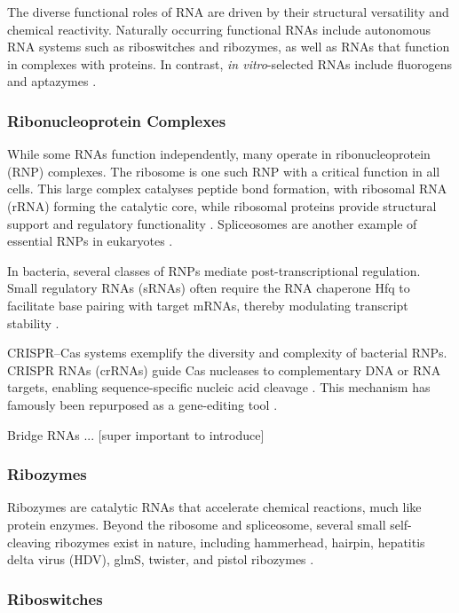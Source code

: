 \documentclass{article}
\begin{document}
The diverse functional roles of RNA are driven by their structural versatility and chemical reactivity. 
Naturally occurring functional RNAs include autonomous RNA systems such as riboswitches and ribozymes, as well as RNAs that function in complexes with proteins.
In contrast, \emph{in vitro}-selected RNAs include fluorogens and aptazymes \parencite{Micura2020}.

\subsubsection*{Ribonucleoprotein Complexes}

While some RNAs function independently, many operate in ribonucleoprotein (RNP) complexes.
The ribosome is one such RNP with a critical function in all cells.
This large complex catalyses peptide bond formation, with ribosomal RNA (rRNA) forming the catalytic core, while ribosomal proteins provide structural support and regulatory functionality \parencite{Wahl2009}.
Spliceosomes are another example of essential RNPs in eukaryotes \parencite{Wahl2009}.

In bacteria, several classes of RNPs mediate post-transcriptional regulation.
Small regulatory RNAs (sRNAs) often require the RNA chaperone Hfq to facilitate base pairing with target mRNAs, thereby modulating transcript stability \parencite{Vogel2006}.

CRISPR--Cas systems exemplify the diversity and complexity of bacterial RNPs.
CRISPR RNAs (crRNAs) guide Cas nucleases to complementary DNA or RNA targets, enabling sequence-specific nucleic acid cleavage \parencite{Barrangou2007}.
This mechanism has famously been repurposed as a gene-editing tool \parencite{Jinek2012}.

Bridge RNAs ... [super important to introduce]

\subsubsection*{Ribozymes}

Ribozymes are catalytic RNAs that accelerate chemical reactions, much like protein enzymes.
Beyond the ribosome and spliceosome, several small self-cleaving ribozymes exist in nature, including hammerhead, hairpin, hepatitis delta virus (HDV), glmS, twister, and pistol ribozymes \parencite{Roth2014, Weinberg2015, Micura2020}. 

\subsubsection*{Riboswitches}
\end{document}

